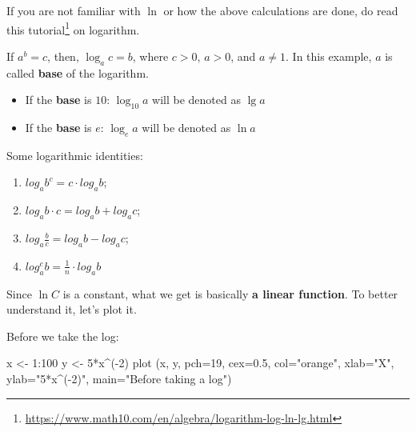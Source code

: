 \documentclass[
]{krantz}
\makeatletter
\newenvironment{Shaded}{\begin{snugshade}}{\end{snugshade}}
\newcommand{\AttributeTok}[1]{\textcolor[rgb]{0.61,0.61,0.61}{#1}}
\newcommand{\DecValTok}[1]{\textcolor[rgb]{0.06,0.06,0.06}{#1}}
\newcommand{\FloatTok}[1]{\textcolor[rgb]{0.06,0.06,0.06}{#1}}
\newcommand{\FunctionTok}[1]{\textcolor[rgb]{0,0,0}{#1}}
\newcommand{\NormalTok}[1]{#1}
\newcommand{\OtherTok}[1]{\textcolor[rgb]{0.37,0.37,0.37}{#1}}
\newcommand{\SpecialCharTok}[1]{\textcolor[rgb]{0,0,0}{#1}}
\newcommand{\StringTok}[1]{\textcolor[rgb]{0.5,0.5,0.5}{#1}}
\providecommand{\tightlist}{%
  \setlength{\itemsep}{0pt}\setlength{\parskip}{0pt}}
\renewcommand{\href}[2]{#2\footnote{\url{#1}}}
\newenvironment{kframe}{%
\medskip{}
\setlength{\fboxsep}{.8em}
 \def\at@end@of@kframe{}%
 \ifinner\ifhmode%
  \def\at@end@of@kframe{\end{minipage}}%
  \begin{minipage}{\columnwidth}%
 \fi\fi%
 \def\FrameCommand##1{\hskip\@totalleftmargin \hskip-\fboxsep
 \colorbox{shadecolor}{##1}\hskip-\fboxsep
     \hskip-\linewidth \hskip-\@totalleftmargin \hskip\columnwidth}%
 \MakeFramed {\advance\hsize-\width
   \@totalleftmargin\z@ \linewidth\hsize
   \@setminipage}}%
 {\par\unskip\endMakeFramed%
 \at@end@of@kframe}
\renewenvironment{Shaded}{\begin{kframe}}{\end{kframe}}
\newenvironment{rmdblock}[1]
  {
  \begin{itemize}
  \renewcommand{\labelitemi}{
    \raisebox{-.7\height}[0pt][0pt]{
      {\setkeys{Gin}{width=3em,keepaspectratio}\texttt{[image: images/\#1]}}
    }
  }
  \setlength{\fboxsep}{1em}
  \begin{kframe}
  \item
  }
  {
  \end{kframe}
  \end{itemize}
  }
\newenvironment{rmdtip}
  {\begin{rmdblock}{tip}}
  {\end{rmdblock}}
\makeatother
\begin{document}
If you are not familiar with \(\ln\) or how the above calculations are done, do read \href{https://www.math10.com/en/algebra/logarithm-log-ln-lg.html}{this tutorial} on logarithm.

\begin{rmdtip}
If \(a^b=c\), then, \(\log_a c =b\), where \(c>0\), \(a>0\), and \(a \neq 1\). In this example, \(a\) is called \textbf{base} of the logarithm.

\begin{itemize}
\tightlist
\item
  If the \textbf{base} is \(10\): \(\log_{10} a\) will be denoted as \emph{\(\lg a\)}
\item
  If the \textbf{base} is \(e\): \(\log_e a\) will be denoted as \emph{\(\ln a\)}
\end{itemize}

Some logarithmic identities:

\begin{enumerate}
\def\labelenumi{\arabic{enumi}.}
\tightlist
\item
  \(log_a b^c = c \cdot log_a b\);
\item
  \(log_a {b \cdot c} = log_a b + log_a c\);
\item
  \(log_a \frac{b}{c} = log_a b - log_a c\);
\item
  \(log_a^c b = \frac{1}{n} \cdot log_a b\)
\end{enumerate}
\end{rmdtip}

Since \(\ln C\) is a constant, what we get is basically \textbf{a linear function}.
To better understand it, let's plot it.

Before we take the log:

\begin{Shaded}
\begin{Highlighting}[]
\NormalTok{x }\OtherTok{\textless{}{-}} \DecValTok{1}\SpecialCharTok{:}\DecValTok{100}
\NormalTok{y }\OtherTok{\textless{}{-}} \DecValTok{5}\SpecialCharTok{*}\NormalTok{x}\SpecialCharTok{\^{}}\NormalTok{(}\SpecialCharTok{{-}}\DecValTok{2}\NormalTok{)}
\FunctionTok{plot}\NormalTok{ (x, y, }\AttributeTok{pch=}\DecValTok{19}\NormalTok{, }\AttributeTok{cex=}\FloatTok{0.5}\NormalTok{, }\AttributeTok{col=}\StringTok{"orange"}\NormalTok{,}
      \AttributeTok{xlab=}\StringTok{"X"}\NormalTok{, }\AttributeTok{ylab=}\StringTok{"5*x\^{}({-}2)"}\NormalTok{,}
      \AttributeTok{main=}\StringTok{"Before taking a log"}\NormalTok{)}
\end{Highlighting}
\end{Shaded}
\end{document}
